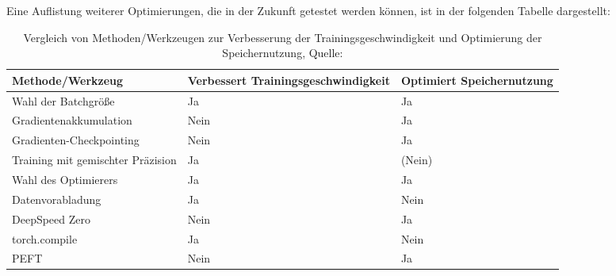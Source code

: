 \documentclass[german,report]{i1thesis}
\begin{document}
Eine Auflistung weiterer Optimierungen, die in der Zukunft getestet werden können, ist in der folgenden Tabelle dargestellt:

\begin{table}[H]
    \centering
    \begin{tabular}{>{\raggedright\arraybackslash}m{6cm} >{\centering\arraybackslash}m{4cm} >{\centering\arraybackslash}m{4cm}}
        \toprule
        \textbf{Methode/Werkzeug}         & \textbf{Verbessert Trainingsgeschwindigkeit} & \textbf{Optimiert Speichernutzung} \\
        \midrule
        Wahl der Batchgröße               & Ja                                           & Ja                                 \\
        Gradientenakkumulation            & Nein                                         & Ja                                 \\
        Gradienten-Checkpointing          & Nein                                         & Ja                                 \\
        Training mit gemischter Präzision & Ja                                           & (Nein)                             \\
        Wahl des Optimierers              & Ja                                           & Ja                                 \\
        Datenvorabladung                  & Ja                                           & Nein                               \\
        DeepSpeed Zero                    & Nein                                         & Ja                                 \\
        torch.compile                     & Ja                                           & Nein                               \\
        \ac{PEFT}                         & Nein                                         & Ja                                 \\
        \bottomrule
    \end{tabular}
    \caption{Vergleich von Methoden/Werkzeugen zur Verbesserung der Trainingsgeschwindigkeit und Optimierung der Speichernutzung, Quelle: \autocite{tabelle-hf}}
    \label{table:vergleich}
\end{table}
\end{document}
